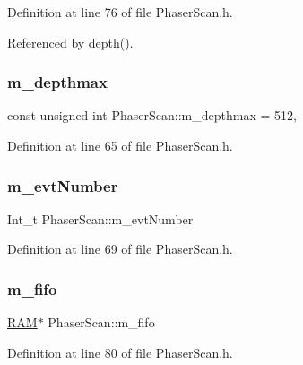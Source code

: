 Definition at line 76 of file Phaser\+Scan.\+h.



Referenced by depth().

\mbox{\label{classPhaserScan_a3c5a969d3fef57564d2632b256bf857e}} 
\subsubsection{\texorpdfstring{m\+\_\+depthmax}{m\_depthmax}}
{\footnotesize\ttfamily const unsigned int Phaser\+Scan\+::m\+\_\+depthmax = 512\hspace{0.3cm}{\ttfamily [static]}, {\ttfamily [private]}}



Definition at line 65 of file Phaser\+Scan.\+h.

\mbox{\label{classPhaserScan_a038d4303bd3f2446417ec2af5d9995cf}} 
\subsubsection{\texorpdfstring{m\+\_\+evt\+Number}{m\_evtNumber}}
{\footnotesize\ttfamily Int\+\_\+t Phaser\+Scan\+::m\+\_\+evt\+Number\hspace{0.3cm}{\ttfamily [private]}}



Definition at line 69 of file Phaser\+Scan.\+h.

\mbox{\label{classPhaserScan_a4249cdec58c8163d9f3663be8e929cdf}} 
\subsubsection{\texorpdfstring{m\+\_\+fifo}{m\_fifo}}
{\footnotesize\ttfamily \hyperlink{classRAM}{R\+AM}$\ast$ Phaser\+Scan\+::m\+\_\+fifo\hspace{0.3cm}{\ttfamily [private]}}



Definition at line 80 of file Phaser\+Scan.\+h.

